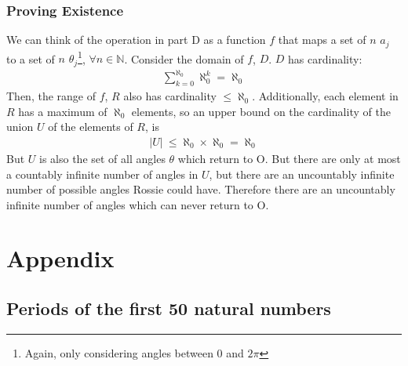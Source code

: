 \documentclass{article}
\begin{document}
  \subsubsection{Proving Existence}
  We can think of the operation in part D as a function $f$ that maps a set of $n$ $a_j$ to a set of $n$ $\theta_j$\footnote{Again, only considering angles between 0 and $2\pi$}, $\forall n \in \mathbb{N}$. Consider the domain of $f$, $D$. $D$ has cardinality:
  \begin{align}
    \sum^{\aleph_0}_{k=0}\aleph_0^k = \aleph_0
  \end{align}
  Then, the range of $f$, $R$ also has cardinality $\leq \aleph_0$. Additionally, each element in $R$ has a maximum of $\aleph_0$ elements, so an upper bound on the cardinality of the union $U$ of the elements of $R$, is
  \begin{align}
    \rvert U \lvert \  \leq \aleph_0 \times \aleph_0 = \aleph_0
  \end{align}
  But $U$ is also the set of all angles $\theta$ which return to O. But there are only at most a countably infinite number of angles in $U$, but there are an uncountably infinite number of possible angles Rossie could have. Therefore there are an uncountably infinite number of angles which can never return to O.
  \section{Appendix}
  \subsection{Periods of the first 50 natural numbers }
\end{document}
